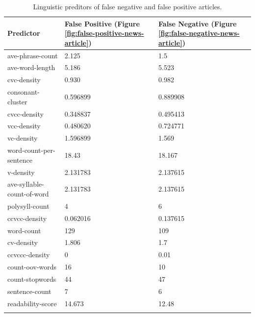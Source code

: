 \begin{table}
    \begin{tabularx}{\textwidth}{|X|X|X|}
        \hline
        Predictor & False Positive (Figure \ref{fig:false-positive-news-article}) & False Negative (Figure \ref{fig:false-negative-news-article}) \\ 
        \hline
        ave-phrase-count & 2.125 & 1.5 \\
        \hline
        ave-word-length & 5.186 & 5.523 \\
        \hline
        cvc-density & 0.930 & 0.982\\ 
        \hline 
        consonant-cluster & 0.596899 & 0.889908 \\
        \hline 
        cvcc-density & 0.348837 & 0.495413 \\
        \hline 
        vcc-density & 0.480620 & 0.724771 \\
        \hline 
        vc-density & 1.596899 & 1.569 \\
        \hline 
        word-count-per-sentence & 18.43 & 18.167\\ 
        \hline 
        v-density & 2.131783 & 2.137615\\ 
        \hline 
        ave-syllable-count-of-word & 2.131783 & 2.137615\\ 
        \hline 
        polysyll-count & 4 & 6 \\ 
        \hline 
        ccvcc-density & 0.062016 & 0.137615 \\ 
        \hline 
        word-count & 129 & 109 \\ 
        \hline 
        cv-density & 1.806 & 1.7\\
        \hline 
        ccvccc-density & 0 & 0.01\\ 
        \hline 
        count-oov-words & 16 & 10 \\ 
        \hline 
        count-stopwords & 44 & 47 \\ 
        \hline 
        sentence-count & 7 & 6 \\ 
        \hline 
        readability-score & 14.673 & 12.48 \\
        \hline
    \caption{Linguistic preditors of false negative and false positive articles.}
    \label{tab::pred_false_class_linguistic}
    \end{tabularx}
\end{table}

